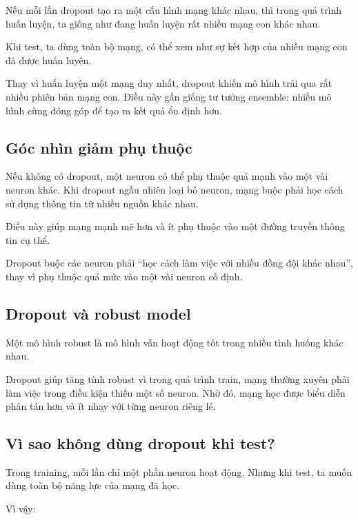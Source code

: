 Nếu mỗi lần dropout tạo ra một cấu hình mạng khác nhau, thì trong quá trình huấn luyện, ta giống như đang huấn luyện rất nhiều mạng con khác nhau.

Khi test, ta dùng toàn bộ mạng, có thể xem như sự kết hợp của nhiều mạng con đã được huấn luyện.

\begin{vidu}
Thay vì huấn luyện một mạng duy nhất, dropout khiến mô hình trải qua rất nhiều phiên bản mạng con. Điều này gần giống tư tưởng ensemble: nhiều mô hình cùng đóng góp để tạo ra kết quả ổn định hơn.
\end{vidu}

\subsection{Góc nhìn giảm phụ thuộc}

Nếu không có dropout, một neuron có thể phụ thuộc quá mạnh vào một vài neuron khác. Khi dropout ngẫu nhiên loại bỏ neuron, mạng buộc phải học cách sử dụng thông tin từ nhiều nguồn khác nhau.

Điều này giúp mạng mạnh mẽ hơn và ít phụ thuộc vào một đường truyền thông tin cụ thể.

\begin{ghinho}
Dropout buộc các neuron phải ``học cách làm việc với nhiều đồng đội khác nhau'', thay vì phụ thuộc quá mức vào một vài neuron cố định.
\end{ghinho}

\subsection{Dropout và robust model}

Một mô hình robust là mô hình vẫn hoạt động tốt trong nhiều tình huống khác nhau.

Dropout giúp tăng tính robust vì trong quá trình train, mạng thường xuyên phải làm việc trong điều kiện thiếu một số neuron. Nhờ đó, mạng học được biểu diễn phân tán hơn và ít nhạy với từng neuron riêng lẻ.

\subsection{Vì sao không dùng dropout khi test?}

Trong training, mỗi lần chỉ một phần neuron hoạt động. Nhưng khi test, ta muốn dùng toàn bộ năng lực của mạng đã học.

Vì vậy:

